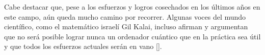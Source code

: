 Cabe destacar que, pese a los esfuerzos y logros cosechados en los últimos años en este campo, aún queda mucho camino por recorrer. Algunas voces del mundo científico, como el matemático israelí Gil Kalai, incluso afirman y argumentan que no será posible lograr nunca un ordenador cuántico que en la práctica sea útil y que todos los esfuerzos actuales serán en vano [\cite{kalai2011quantum}].